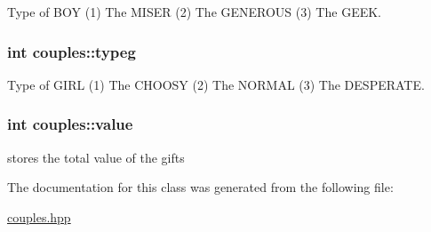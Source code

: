 Type of B\-O\-Y (1) The M\-I\-S\-E\-R (2) The G\-E\-N\-E\-R\-O\-U\-S (3) The G\-E\-E\-K. 

\hypertarget{classcouples_aa426275873426f8c89fcc51cc0dc35d7}{
\subsubsection[{typeg}]{\setlength{\rightskip}{0pt plus 5cm}int couples\-::typeg}}\label{classcouples_aa426275873426f8c89fcc51cc0dc35d7}


Type of G\-I\-R\-L (1) The C\-H\-O\-O\-S\-Y (2) The N\-O\-R\-M\-A\-L (3) The D\-E\-S\-P\-E\-R\-A\-T\-E. 

\hypertarget{classcouples_a7ead49e8a89affe8f2988196947e280c}{
\subsubsection[{value}]{\setlength{\rightskip}{0pt plus 5cm}int couples\-::value}}\label{classcouples_a7ead49e8a89affe8f2988196947e280c}


stores the total value of the gifts 



The documentation for this class was generated from the following file\-:\begin{DoxyCompactItemize}
\item 
\hyperlink{couples_8hpp}{couples.\-hpp}\end{DoxyCompactItemize}
